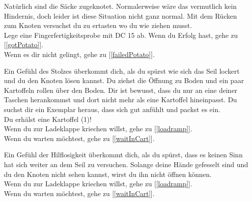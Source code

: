 
Natürlich sind die Säcke zugeknotet. Normalerweise wäre das vermutlich kein Hindernis, doch leider ist diese Situation nicht ganz normal. Mit dem Rücken zum Knoten versuchst du zu ertasten wo du wie ziehen musst.
\\Lege eine Fingerfertigkeitsprobe mit DC 15 ab. Wenn du Erfolg hast, gehe zu [\ref{gotPotato}].
\\Wenn es dir nicht gelingt, gehe zu [\ref{failedPotato}].


Ein Gefühl des Stolzes überkommt dich, als du spürst wie sich das Seil lockert und du den Knoten lösen kannst. Du ziehst die Öffnung zu Boden und ein paar Kartoffeln rollen über den Boden. Dir ist bewusst, dass du nur an eine deiner Taschen herankommst und dort nicht mehr als eine Kartoffel hineinpasst. Du suchst dir ein Exemplar heraus, dass sich gut anfühlt und packst es ein.
\\Du erhälst eine Kartoffel (1)!
\\Wenn du zur Ladeklappe kriechen willst, gehe zu [\ref{loadramp}].
\\Wenn du warten möchtest, gehe zu [\ref{waitInCart}].


Ein Gefühl der Hilflosigkeit überkommt dich, als du spürst, dass es keinen Sinn hat sich weiter an dem Seil zu versuchen. Solange deine Hände gefesselt sind und du den Knoten nicht sehen kannst, wirst du ihn nicht öffnen können.
\\Wenn du zur Ladeklappe kriechen willst, gehe zu [\ref{loadramp}].
\\Wenn du warten möchtest, gehe zu [\ref{waitInCart}].
